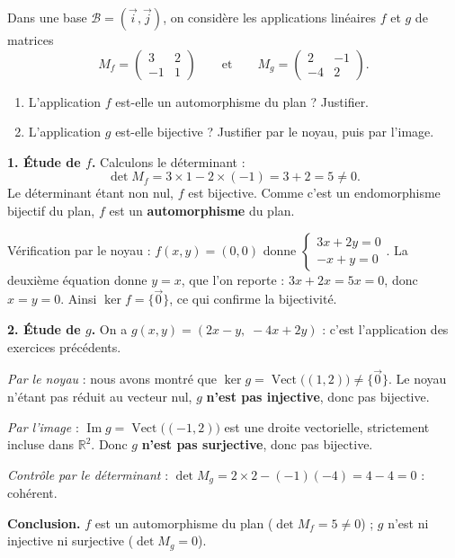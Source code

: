 \documentclass[11pt]{article}
\begin{document}
\begin{exoresolu}
Dans une base $\mathcal{B} = (\vec{i}, \vec{j})$, on considère les applications linéaires $f$ et $g$ de matrices
\[ M_f = \begin{pmatrix} 3 & 2 \\ -1 & 1 \end{pmatrix} \qquad \text{et} \qquad M_g = \begin{pmatrix} 2 & -1 \\ -4 & 2 \end{pmatrix}. \]
\begin{enumerate}
\item L'application $f$ est-elle un automorphisme du plan ? Justifier.
\item L'application $g$ est-elle bijective ? Justifier par le noyau, puis par l'image.
\end{enumerate}
\tcblower
\textbf{1. Étude de $f$.} Calculons le déterminant :
\[ \det M_f = 3 \times 1 - 2 \times (-1) = 3 + 2 = 5 \neq 0. \]
Le déterminant étant non nul, $f$ est bijective. Comme c'est un endomorphisme bijectif du plan, $f$ est un \textbf{automorphisme} du plan.

Vérification par le noyau : $f(x,y) = (0,0)$ donne $\begin{cases} 3x + 2y = 0 \\ -x + y = 0 \end{cases}$. La deuxième équation donne $y = x$, que l'on reporte : $3x + 2x = 5x = 0$, donc $x = y = 0$. Ainsi $\ker f = \{\vec{0}\}$, ce qui confirme la bijectivité.

\textbf{2. Étude de $g$.} On a $g(x, y) = (2x - y,\; -4x + 2y)$ : c'est l'application des exercices précédents.

\emph{Par le noyau} : nous avons montré que $\ker g = \operatorname{Vect}\big((1, 2)\big) \neq \{\vec{0}\}$. Le noyau n'étant pas réduit au vecteur nul, $g$ \textbf{n'est pas injective}, donc pas bijective.

\emph{Par l'image} : $\operatorname{Im} g = \operatorname{Vect}\big((-1, 2)\big)$ est une droite vectorielle, strictement incluse dans $\mathbb{R}^2$. Donc $g$ \textbf{n'est pas surjective}, donc pas bijective.

\emph{Contrôle par le déterminant} : $\det M_g = 2 \times 2 - (-1)(-4) = 4 - 4 = 0$ : cohérent.

\textbf{Conclusion.} $f$ est un automorphisme du plan ($\det M_f = 5 \neq 0$) ; $g$ n'est ni injective ni surjective ($\det M_g = 0$).
\end{exoresolu}
\end{document}
